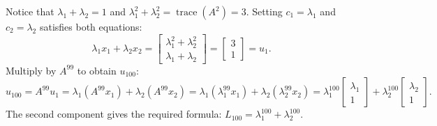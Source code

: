 \documentclass[11pt,a4paper,openany,oneside]{book}
\def\vect#1{#1}%
\def\mathbf#1{#1}%
\newcommand{\vect}[1]{\mathbf{#1}}
\numberwithin{equation}{chapter}
\begin{document}
Notice that $\lambda_1 + \lambda_2 = 1$ and $\lambda_1^2 + \lambda_2^2 = \operatorname{trace}(A^2) = 3$. Setting $c_1 = \lambda_1$ and $c_2 = \lambda_2$ satisfies both equations:
\[
\lambda_1\vect{x}_1 + \lambda_2\vect{x}_2 = \begin{bmatrix} \lambda_1^2 + \lambda_2^2 \\ \lambda_1 + \lambda_2 \end{bmatrix} = \begin{bmatrix} 3 \\ 1 \end{bmatrix} = \vect{u}_1.
\]
Multiply by $A^{99}$ to obtain $\vect{u}_{100}$:
\[
\vect{u}_{100} = A^{99}\vect{u}_1 = \lambda_1(A^{99}\vect{x}_1) + \lambda_2(A^{99}\vect{x}_2) = \lambda_1(\lambda_1^{99}\vect{x}_1) + \lambda_2(\lambda_2^{99}\vect{x}_2) = \lambda_1^{100}\begin{bmatrix} \lambda_1 \\ 1 \end{bmatrix} + \lambda_2^{100}\begin{bmatrix} \lambda_2 \\ 1 \end{bmatrix}.
\]
The second component gives the required formula: $L_{100} = \lambda_1^{100} + \lambda_2^{100}$.
\end{document}
